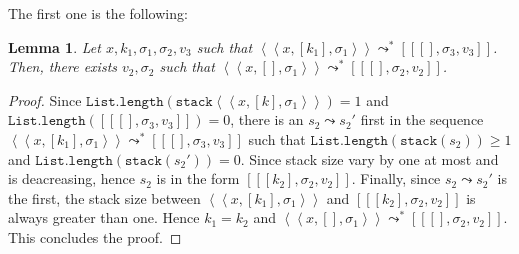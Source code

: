 \documentclass[english, references=cleveref]{programming}
\newtheorem{lemma}[theorem]{Lemma}
\newcommand{\leval}{\left\langle\!\!\left\langle}
\newcommand{\reval}{\right\rangle\!\!\right\rangle}
\newcommand{\lcont}{\left[\!\!\left[}
\newcommand{\rcont}{\right]\!\!\right]}
\begin{document}
The first one is the following:

\begin{lemma}
  Let $x, k_1, \sigma_1, \sigma_2, v_3$ such that $\leval x, [k_1], \sigma_1 \reval \leadsto^* \lcont [], \sigma_3, v_3 \rcont$. Then, there exists $v_2, \sigma_2$ such that $\leval x, [], \sigma_1 \reval \leadsto^* \lcont [], \sigma_2, v_2 \rcont$.
\end{lemma}

\begin{proof}
  Since $\mathtt{List.length}(\mathtt{stack} \leval x, [k], \sigma_1 \reval) = 1$ and $\mathtt{List.length} (\lcont [], \sigma_3, v_3 \rcont) = 0$, there is an $s_2 \leadsto s_2'$ first in the sequence $\leval x, [k_1], \sigma_1 \reval \leadsto^* \lcont [], \sigma_3, v_3 \rcont$ such that $\mathtt{List.length}(\mathtt{stack}(s_2)) \geq 1$ and $\mathtt{List.length}(\mathtt{stack}(s_2')) = 0$. Since stack size vary by one at most and is deacreasing, hence $s_2$ is in the form $\lcont [k_2], \sigma_2, v_2 \rcont$. Finally, since $s_2 \leadsto s_2'$ is the first, the stack size between $\leval x, [k_1], \sigma_1 \reval$ and $\lcont [k_2], \sigma_2, v_2 \rcont$ is always greater than one. Hence $k_1 = k_2$ and $\leval x, [], \sigma_1 \reval \leadsto^* \lcont [], \sigma_2, v_2 \rcont$. This concludes the proof.
\end{proof}




\printbibliography
\end{document}
